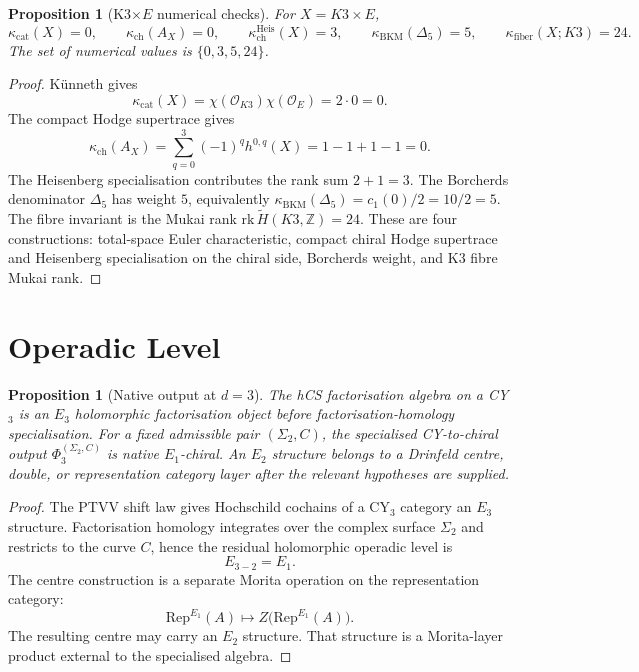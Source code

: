 \documentclass[11pt]{amsart}
\providecommand{\Z}{\mathbb{Z}}
\providecommand{\cO}{\mathcal{O}}
\providecommand{\kch}{\kappa_{\mathrm{ch}}}
\providecommand{\kcat}{\kappa_{\mathrm{cat}}}
\providecommand{\kBKM}{\kappa_{\mathrm{BKM}}}
\providecommand{\kfib}{\kappa_{\mathrm{fiber}}}
\theoremstyle{plain}
\newtheorem{proposition}[theorem]{Proposition}
\theoremstyle{definition}
\theoremstyle{remark}
\begin{document}
\begin{proposition}[K3$\times E$ numerical checks]\label{prop:k3e-numerical-checks}
For $X=K3\times E$,
\[
 \kcat(X)=0,\qquad
 \kch(A_X)=0,\qquad
 \kch^{\mathrm{Heis}}(X)=3,\qquad
 \kBKM(\Delta_5)=5,\qquad
 \kfib(X;K3)=24.
\]
The set of numerical values is $\{0,3,5,24\}$.
\end{proposition}

\begin{proof}
K\"unneth gives
\[
 \kcat(X)=\chi(\cO_{K3})\chi(\cO_E)=2\cdot0=0.
\]
The compact Hodge supertrace gives
\[
 \kch(A_X)=\sum_{q=0}^3(-1)^q h^{0,q}(X)=1-1+1-1=0.
\]
The Heisenberg specialisation contributes the rank sum $2+1=3$. The
Borcherds denominator $\Delta_5$ has weight $5$, equivalently
$\kBKM(\Delta_5)=c_1(0)/2=10/2=5$. The fibre invariant is the Mukai rank
$\mathrm{rk}\,\widetilde H(K3,\Z)=24$. These are four constructions:
total-space Euler characteristic, compact chiral Hodge supertrace and
Heisenberg specialisation on the chiral side, Borcherds weight, and K3
fibre Mukai rank.
\end{proof}

\section{Operadic Level}

\begin{proposition}[Native output at $d=3$]\label{prop:d3-native-output-j2}
The hCS factorisation algebra on a CY$_3$ is an $E_3$ holomorphic
factorisation object before factorisation-homology specialisation. For
a fixed admissible pair $(\Sigma_2,C)$, the specialised CY-to-chiral
output $\Phi_3^{(\Sigma_2,C)}$ is native $E_1$-chiral. An $E_2$
structure belongs to a Drinfeld centre, double, or representation
category layer after the relevant hypotheses are supplied.
\end{proposition}

\begin{proof}
The PTVV shift law gives Hochschild cochains of a CY$_3$ category an
$E_3$ structure. Factorisation homology integrates over the complex
surface $\Sigma_2$ and restricts to the curve $C$, hence the residual
holomorphic operadic level is
\[
 E_{3-2}=E_1.
\]
The centre construction is a separate Morita operation on the
representation category:
\[
 \mathrm{Rep}^{E_1}(A)\longmapsto
 Z\bigl(\mathrm{Rep}^{E_1}(A)\bigr).
\]
The resulting centre may carry an $E_2$ structure. That structure is a
Morita-layer product external to the specialised algebra.
\end{proof}
\end{document}
